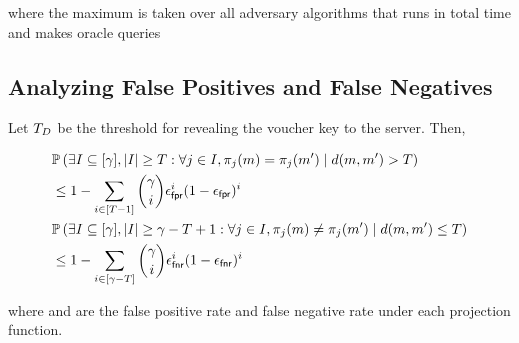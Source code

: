 
\noindent
where the maximum is taken over all adversary algorithms
\indsrAdversaryComb that runs in total time \timeBound and makes
\oracleQueries oracle queries
\fi 

\iffalse 
\subsection{Analyzing False Positives and False Negatives}
\label{sec:fpr_analysis}

\begin{theorem}
Let $T_{D}$ be the threshold for revealing the voucher key to the server. Then, 

		
		\begin{small}
		\begin{align}
			& \cprob{}{\exists I \subseteq \nats[\numProjections], \setSize{I} \ge \threshold: \forall \projIdx \in I, 
				\projFn[\projIdx](\genericMetricSpaceElmt) = \projFn[\projIdx](\genericMetricSpaceElmtAlt)}{\distanceNotation[\distance][\genericMetricSpaceElmt][\genericMetricSpaceElmtAlt] > 
			\threshold} \nonumber \\ 
& \le 1 - \sum\limits_{i \in \nats[\threshold - 1]} \binom{\numProjections}{i} \fpr^{i} (1 - \fpr)^{i}
 \\
			& \cprob{}{\exists I \subseteq \nats[\numProjections], \setSize{I} \ge \numProjections - \threshold + 1: \forall \projIdx \in I, 
				\projFn[\projIdx](\genericMetricSpaceElmt) \neq \projFn[\projIdx](\genericMetricSpaceElmtAlt)}{\distanceNotation[\distance][\genericMetricSpaceElmt][\genericMetricSpaceElmtAlt] \le 
			\threshold} \nonumber \\ 
& \le 1 - \sum\limits_{i \in \nats[\numProjections - \threshold]} \binom{\numProjections}{i} \fnr^{i} (1 - \fnr)^{i}
 \\
		\end{align}
		\end{small}
where \fpr and \fnr are the false positive rate and false negative rate under each projection function.

\end{theorem}

